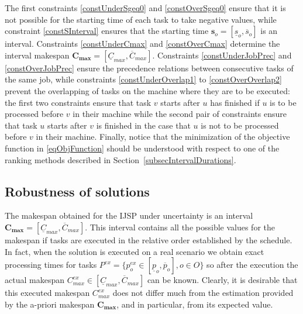 \documentclass[icae]{iosart2x}
\newcommand{\reviewed}[1]{#1} %
\begin{document}
\reviewed{The first constraints \eqref{constUnderSgeq0} and \eqref{constOverSgeq0} ensure that it is not possible for the starting time of each task to take negative values, while constraint \eqref{constSInterval} ensures that the starting time $\mathbf{s}_o=[\underline{s}_o, \overline{s}_o]$ is an interval.  Constraints \eqref{constUnderCmax} and \eqref{constOverCmax} determine the interval makespan $\mathbf{C_{max}}=[\underline{C}_{max}, \overline{C}_{max}]$.  Constraints \eqref{constUnderJobPrec} and \eqref{constOverJobPrec} ensure the precedence relations between consecutive tasks of the same job, while constraints \eqref{constUnderOverlap1} to \eqref{constOverOverlap2} prevent the overlapping of tasks on the machine where they are to be executed: the first two constraints ensure that task $v$ starts after $u$ has finished if $u$ is to be processed before $v$ in their machine while the second pair of constraints ensure that task $u$ starts after $v$ is finished in the case that $u$ is not to be processed before $v$ in their machine. Finally, notice that the minimization of the objective function in \eqref{eqObjFunction} should be understood with respect to one of the ranking methods described in Section~\ref{subsecIntervalDurations}.}


\subsection{Robustness of solutions}\label{secRobustness}
The makespan obtained for the IJSP under uncertainty is an interval $\mathbf{C_{max}}=[\underline{C}_{max}, \overline{C}_{max}]$. This interval contains all the possible values for the makespan if tasks are executed in the relative order established by the schedule. In fact,  when the solution is executed on a real scenario we obtain exact processing times for tasks $P^{ex}=\{p_o^{ex} \in [\underline{p}_o, \overline{p}_o], o \in O\}$ so after the execution the actual makespan $C_{max}^{ex} \in [\underline{C}_{max}, \overline{C}_{max}]$ can be known.  Clearly, it is desirable that this executed makespan $C_{max}^{ex}$ does not differ much from the estimation provided by the a-priori makespan $\mathbf{C_{max}}$, and in particular, from its expected value.
\end{document}
